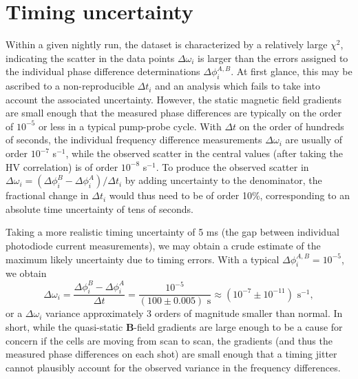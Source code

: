 \documentclass [10pt, twoside] {uwthesis}[2012/04/02]
\begin{document}
\section{Timing uncertainty}
Within a given nightly run, the dataset is characterized by a relatively large $\chi^2$, indicating the scatter in the data points $\Delta\omega_i$ is larger than the errors assigned to the individual phase difference determinations $\Delta\phi_i^{A,B}$. At first glance, this may be ascribed to a non-reproducible $\Delta t_i$ and an analysis which fails to take into account the associated uncertainty. However, the static magnetic field gradients are small enough that the measured phase differences are typically on the order of $10^{-5}$ or less in a typical pump-probe cycle. With $\Delta t$ on the order of hundreds of seconds, the individual frequency difference measurements $\Delta\omega_i$ are usually of order $10^{-7}$ s$^{-1}$, while the observed scatter in the central values (after taking the HV correlation) is of order $10^{-8}$ s$^{-1}$. To produce the observed scatter in $\Delta\omega_i = (\Delta\phi_i^B - \Delta\phi_i^A)/\Delta t_i$ by adding uncertainty to the denominator, the fractional change in $\Delta t_i$ would thus need to be of order 10\%, corresponding to an absolute time uncertainty of tens of seconds. 

Taking a more realistic timing uncertainty of 5 ms (the gap between individual photodiode current measurements), we may obtain a crude estimate of the maximum likely uncertainty due to timing errors. 
With a typical $\Delta\phi_i^{A,B} = 10^{-5}$, we obtain
\begin{equation}
\Delta\omega_i = \dfrac{\Delta\phi_i^B - \Delta\phi_i^A}{\Delta t} = \dfrac{10^{-5}}{(100 \pm 0.005 )\text{ s}} \approx (10^{-7}\pm  10^{-11}) \text{ s}^{-1},
\end{equation}
or a $\Delta\omega_i$ variance approximately 3 orders of magnitude smaller than normal. In short, while the quasi-static $\mathbf{B}$-field gradients are large enough to be a cause for concern if the cells are moving from scan to scan, the gradients (and thus the measured phase differences on each shot) are small enough that a timing jitter cannot plausibly account for the observed variance in the frequency differences.
\end{document}
